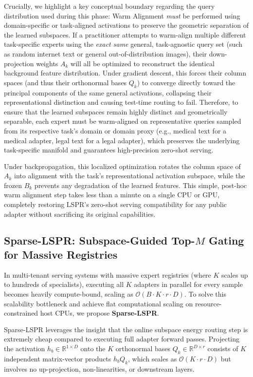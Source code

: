 Crucially, we highlight a key conceptual boundary regarding the query distribution used during this phase: Warm Alignment \textit{must} be performed using domain-specific or task-aligned activations to preserve the geometric separation of the learned subspaces. If a practitioner attempts to warm-align multiple different task-specific experts using the \textit{exact same} general, task-agnostic query set (such as random internet text or general out-of-distribution images), their down-projection weights $A_k$ will all be optimized to reconstruct the identical background feature distribution. Under gradient descent, this forces their column spaces (and thus their orthonormal bases $Q_k$) to converge directly toward the principal components of the same general activations, collapsing their representational distinction and causing test-time routing to fail. Therefore, to ensure that the learned subspaces remain highly distinct and geometrically separable, each expert must be warm-aligned on representative queries sampled from its respective task's domain or domain proxy (e.g., medical text for a medical adapter, legal text for a legal adapter), which preserves the underlying task-specific manifold and guarantees high-precision zero-shot serving.

Under backpropagation, this localized optimization rotates the column space of $A_k$ into alignment with the task's representational activation subspace, while the frozen $B_k$ prevents any degradation of the learned features. This simple, post-hoc warm alignment step takes less than a minute on a single CPU or GPU, completely restoring LSPR's zero-shot serving compatibility for any public adapter without sacrificing its original capabilities.

\subsection{Sparse-LSPR: Subspace-Guided Top-$M$ Gating for Massive Registries}
\label{subsec:method_sparse_lspr}

In multi-tenant serving systems with massive expert registries (where $K$ scales up to hundreds of specialists), executing all $K$ adapters in parallel for every sample becomes heavily compute-bound, scaling as $\mathcal{O}(B \cdot K \cdot r \cdot D)$. To solve this scalability bottleneck and achieve flat computational scaling on resource-constrained host CPUs, we propose \textbf{Sparse-LSPR}.

Sparse-LSPR leverages the insight that the online subspace energy routing step is extremely cheap compared to executing full adapter forward passes. Projecting the activation $h_b \in \mathbb{R}^{1 \times D}$ onto the $K$ orthonormal bases $Q_k \in \mathbb{R}^{D \times r}$ consists of $K$ independent matrix-vector products $h_b Q_k$, which scales as $\mathcal{O}(K \cdot r \cdot D)$ but involves no up-projection, non-linearities, or downstream layers.

